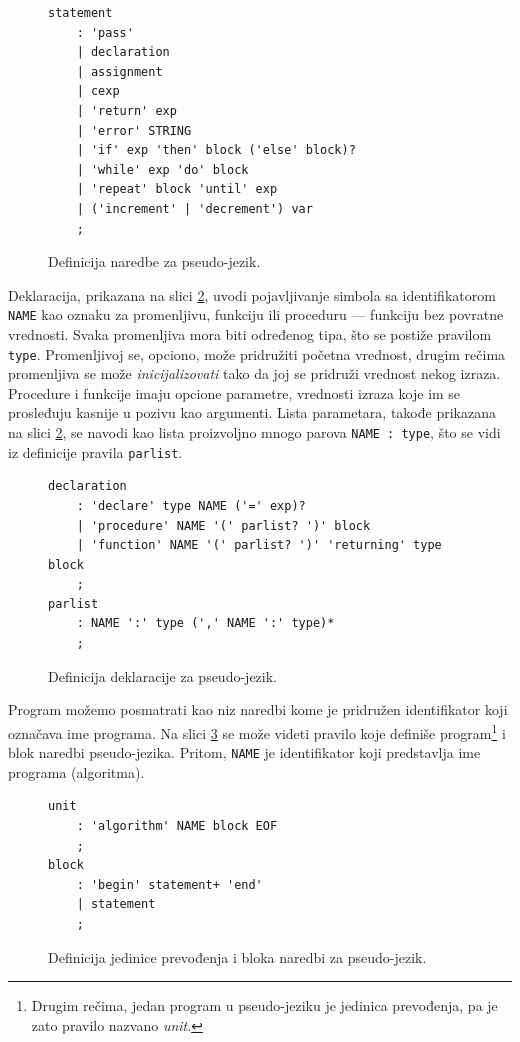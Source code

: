 \begin{figure}[h!]
\begin{lstlisting}[language={}]
statement
    : 'pass'
    | declaration
    | assignment
    | cexp
    | 'return' exp
    | 'error' STRING
    | 'if' exp 'then' block ('else' block)? 
    | 'while' exp 'do' block 
    | 'repeat' block 'until' exp
    | ('increment' | 'decrement') var	
    ;
\end{lstlisting}
\caption{Definicija naredbe za pseudo-jezik.}
\label{fig:PseudoDef2}
\end{figure}

Deklaracija, prikazana na slici \ref{fig:PseudoDef3}, uvodi pojavljivanje simbola sa identifikatorom \texttt{NAME} kao oznaku za promenljivu, funkciju ili proceduru --- funkciju bez povratne vrednosti. Svaka promenljiva mora biti određenog tipa, što se postiže pravilom \texttt{type}. Promenljivoj se, opciono, može pridružiti početna vrednost, drugim rečima promenljiva se može \emph{inicijalizovati} tako da joj se pridruži vrednost nekog izraza. Procedure i funkcije imaju opcione parametre, vrednosti izraza koje im se prosleđuju kasnije u pozivu kao argumenti. Lista parametara, takođe prikazana na slici \ref{fig:PseudoDef3}, se navodi kao lista proizvoljno mnogo parova \texttt{NAME : type}, što se vidi iz definicije pravila \texttt{parlist}.

\begin{figure}[h!]
\begin{lstlisting}[language={}]
declaration
    : 'declare' type NAME ('=' exp)? 
    | 'procedure' NAME '(' parlist? ')' block 
    | 'function' NAME '(' parlist? ')' 'returning' type block 
    ;
parlist
    : NAME ':' type (',' NAME ':' type)*
    ;
\end{lstlisting}
\caption{Definicija deklaracije za pseudo-jezik.}
\label{fig:PseudoDef3}
\end{figure}

Program možemo posmatrati kao niz naredbi kome je pridružen identifikator koji označava ime programa. Na slici \ref{fig:PseudoDef1} se može videti pravilo koje definiše program\footnote{Drugim rečima, jedan program u pseudo-jeziku je jedinica prevođenja, pa je zato pravilo nazvano \emph{unit}.} i blok naredbi pseudo-jezika. Pritom, \texttt{NAME} je identifikator koji predstavlja ime programa (algoritma).

\begin{figure}[h!]
\begin{lstlisting}[language={}]
unit
    : 'algorithm' NAME block EOF
    ;
block
    : 'begin' statement+ 'end'
    | statement
    ;
\end{lstlisting}
\caption{Definicija jedinice prevođenja i bloka naredbi za pseudo-jezik.}
\label{fig:PseudoDef1}
\end{figure}

